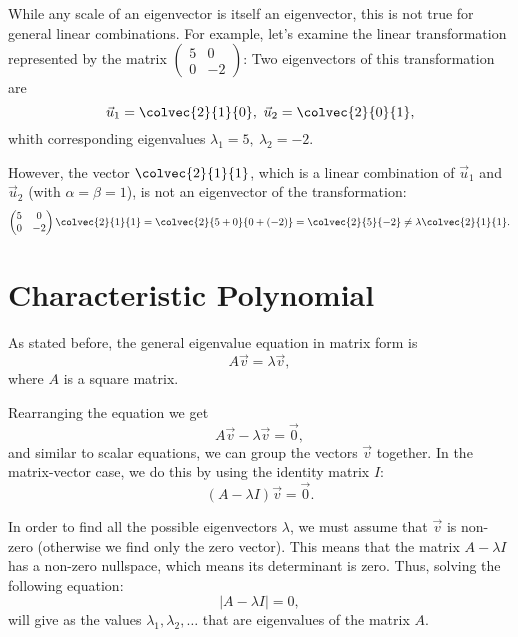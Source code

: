 \vspace{1cm}
\begin{warning}
  While any scale of an eigenvector is itself an eigenvector, this is not true for general linear combinations. For example, let's examine the linear transformation represented by the matrix $\begin{pmatrix} 5 & 0 \\ 0 & -2 \end{pmatrix}$: Two eigenvectors of this transformation are
  \begin{equation*}
	\vec{u}_{1} = \colvec{2}{1}{0},\ \vec{u}_{2} = \colvec{2}{0}{1},
  \end{equation*}
  whith corresponding eigenvalues $\lambda_{1}=5,\ \lambda_{2}=-2$.

  However, the vector $\colvec{2}{1}{1}$, which is a linear combination of $\vec{u}_{1}$ and $\vec{u}_{2}$ (with $\alpha=\beta=1$), is not an eigenvector of the transformation:
  \begin{equation*}
	\begin{pmatrix} 5 & 0 \\ 0 & -2 \end{pmatrix}\colvec{2}{1}{1} = \colvec{2}{5+0}{0+(-2)} = \colvec{2}{5}{-2} \neq \lambda \colvec{2}{1}{1}.
  \end{equation*}
\end{warning}

\section{Characteristic Polynomial}
As stated before, the general eigenvalue equation in matrix form is
\begin{equation*}
  A\vec{v} = \lambda\vec{v},
\end{equation*}
where $A$ is a square matrix.

Rearranging the equation we get
\begin{equation*}
  A\vec{v} - \lambda\vec{v} = \vec{0},
\end{equation*}
and similar to scalar equations, we can group the vectors $\vec{v}$ together. In the matrix-vector case, we do this by using the identity matrix $I$:
\begin{equation*}
  \left( A-\lambda I \right)\vec{v} = \vec{0}.
\end{equation*}

In order to find all the possible eigenvectors $\lambda$, we must assume that $\vec{v}$ is non-zero (otherwise we find only the zero vector). This means that the matrix $A-\lambda I$ has a non-zero nullspace, which means its determinant is zero. Thus, solving the following equation:
\begin{equation*}
  \left| A-\lambda I\right| = 0,
\end{equation*}
will give as the values $\lambda_{1}, \lambda_{2}, \dots$ that are eigenvalues of the matrix $A$.

